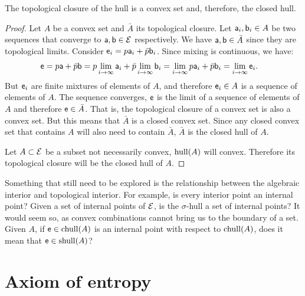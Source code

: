 \begin{mathSection}
\begin{prop}
	The topological closure of the hull is a convex set and, therefore, the closed hull.
\end{prop}

\begin{proof}
	Let $A$ be a convex set and $\bar{A}$ its topological closure. Let $\ens[a]_i, \ens[b]_i \in A$ be two sequences that converge to $\ens[a], \ens[b] \in \Ens$ respectively. We have $\ens[a], \ens[b] \in \bar{A}$ since they are topological limits. Consider $\ens_i = p \ens[a]_i + \bar{p} \ens[b]_i$. Since mixing is continuous, we have:
	\begin{equation}
		\begin{aligned}
			\ens &= p \ens[a] + \bar{p} \ens[b] = p \lim\limits_{i \to \infty} \ens[a]_i + \bar{p} \lim\limits_{i \to \infty} \ens[b]_i = \lim\limits_{i \to \infty} p \ens[a]_i + \bar{p} \ens[b]_i = \lim\limits_{i \to \infty} \ens_i.
		\end{aligned}
	\end{equation}
	But $\ens_i$ are finite mixtures of elements of $A$, and therefore $\ens_i \in A$ is a sequence of elements of $A$. The sequence converges, $\ens$ is the limit of a sequence of elements of $A$ and therefore $\ens \in \bar{A}$. That is, the topological closure of a convex set is also a convex set. But this means that $\bar{A}$ is a closed convex set. Since any closed convex set that contains $A$ will also need to contain $\bar{A}$, $\bar{A}$ is the closed hull of $A$.

	Let $A \subset \Ens$ be a subset not necessarily convex, $\hull(A)$ will convex. Therefore its topological closure will be the closed hull of $A$.
\end{proof}

\end{mathSection}

Something that still need to be explored is the relationship between the algebraic interior and topological interior. For example, is every interior point an internal point? Given a set of internal points of $\Ens$, is the $\sigma$-hull a set of internal points? It would seem so, as convex combinations cannot bring us to the boundary of a set. Given $A$, if $\ens \in \chull(A)$ is an internal point with respect to $\chull(A)$, does it mean that $\ens \in \shull(A)$?


\section{Axiom of entropy}


